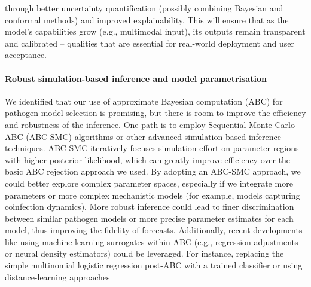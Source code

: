 through better uncertainty quantification (possibly combining Bayesian and conformal methods) and improved explainability. This will ensure that as the model’s capabilities grow (e.g., multimodal input), its outputs remain transparent and calibrated – qualities that are essential for real-world deployment and user acceptance.

\paragraph{Robust simulation-based inference and model parametrisation} We identified that our use of approximate Bayesian computation (ABC) for pathogen model selection is promising, but there is room to improve the efficiency and robustness of the inference. One path is to employ Sequential Monte Carlo ABC (ABC-SMC) algorithms or other advanced simulation-based inference techniques. ABC-SMC iteratively focuses simulation effort on parameter regions with higher posterior likelihood, which can greatly improve efficiency over the basic ABC rejection approach we used. By adopting an ABC-SMC approach, we could better explore complex parameter spaces, especially if we integrate more parameters or more complex mechanistic models (for example, models capturing coinfection dynamics). More robust inference could lead to finer discrimination between similar pathogen models or more precise parameter estimates for each model, thus improving the fidelity of forecasts. Additionally, recent developments like using machine learning surrogates within ABC (e.g., regression adjustments or neural density estimators) could be leveraged. For instance, replacing the simple multinomial logistic regression post-ABC with a trained classifier or using distance-learning approaches
